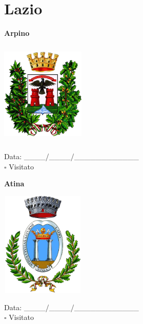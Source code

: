 \documentclass[a5paper,12pt]{article}
\begin{document}
\newpage

\section*{Lazio}

\newpage

\noindent
\begin{minipage}[t]{0.45\textwidth}
    \begin{center}
        \textbf{Arpino}
    \end{center}
    \vspace{-0.5cm} %
    \begin{center}
        \includegraphics[height= 5cm, width=4cm]{Lazio/Stemma Arpino.png}
    \end{center}
    \vspace{-0.4cm} %
    \begin{flushleft}
        Data: \_\_\_\_/\_\_\_\_/\_\_\_\_\_\_\_\_\_\_\_\_ \\
        $\square$ Visitato
    \end{flushleft}
\end{minipage}
\hfill
\noindent
\begin{minipage}[t]{0.45\textwidth}
    \begin{center}
        \textbf{Atina}
    \end{center}
    \vspace{-0.5cm} %
    \begin{center}
        \includegraphics[height= 5cm, width=4cm]{Lazio/Stemma Atina.png}
    \end{center}
    \vspace{-0.4cm} %
    \begin{flushleft}
        Data: \_\_\_\_/\_\_\_\_/\_\_\_\_\_\_\_\_\_\_\_\_ \\
        $\square$ Visitato
    \end{flushleft}
\end{minipage}
\end{document}
